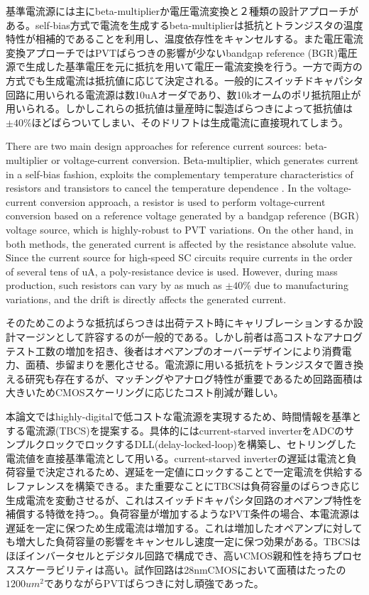 \documentclass[letterpaper, 10 pt, conference]{ieeeconf}  %
\begin{document}
基準電流源には主にbeta-multiplierか電圧電流変換と２種類の設計アプローチがある。self-bias方式で電流を生成するbeta-multiplierは抵抗とトランジスタの温度特性が相補的であることを利用し、温度依存性をキャンセルする\cite{azcona2014precision, osipov2016temperature}。また電圧電流変換アプローチではPVTばらつきの影響が少ないbandgap reference (BGR)電圧源で生成した基準電圧を元に抵抗を用いて電圧ー電流変換を行う\cite{banba1999cmos, ueno2009300}。一方で両方の方式でも生成電流は抵抗値に応じて決定される。一般的にスイッチドキャパシタ回路に用いられる電流源は数10uAオーダであり、数10kオームのポリ抵抗阻止が用いられる。しかしこれらの抵抗値は量産時に製造ばらつきによって抵抗値は$\pm40\%$ほどばらついてしまい、そのドリフトは生成電流に直接現れてしまう。

There are two main design approaches for reference current sources: beta-multiplier or voltage-current conversion. Beta-multiplier, which generates current in a self-bias fashion, exploits the complementary temperature characteristics of resistors and transistors to cancel the temperature dependence \cite{ azcona2014precision, osipov2016temperature}. In the voltage-current conversion approach, a resistor is used to perform voltage-current conversion based on a reference voltage generated by a bandgap reference (BGR) voltage source, which is highly-robust to PVT variations. On the other hand, in both methods, the generated current is affected by the resistance absolute value. Since the current source for high-speed SC circuits require currents in the order of several tens of uA, a poly-resistance device is used. However, during mass production, such resistors can vary by as much as $\pm40\%$ due to manufacturing variations, and the drift is directly affects the generated current.

そのためこのような抵抗ばらつきは出荷テスト時にキャリブレーションするか設計マージンとして許容するのが一般的である。しかし前者は高コストなアナログテスト工数の増加を招き、後者はオペアンプのオーバーデザインにより消費電力、面積、歩留まりを悪化させる。電流源に用いる抵抗をトランジスタで置き換える研究も存在するが\cite{hirose2010nano, osaki20131, choi201423pw}、マッチングやアナログ特性が重要であるため回路面積は大きいためCMOSスケーリングに応じたコスト削減が難しい。

本論文ではhighly-digitalで低コストな電流源を実現するため、時間情報を基準とする電流源(TBCS)を提案する\cite{yoshioka201728}。具体的にはcurrent-starved inverterをADCのサンプルクロックでロックするDLL(delay-locked-loop)を構築し、セトリングした電流値を直接基準電流として用いる。current-starved inverterの遅延は電流と負荷容量で決定されるため、遅延を一定値にロックすることで一定電流を供給するレファレンスを構築できる。また重要なことにTBCSは負荷容量のばらつき応じ生成電流を変動させるが、これはスイッチドキャパシタ回路のオペアンプ特性を補償する特徴を持つ。。負荷容量が増加するようなPVT条件の場合、本電流源は遅延を一定に保つため生成電流は増加する。これは増加したオペアンプに対しても増大した負荷容量の影響をキャンセルし速度一定に保つ効果がある。TBCSはほぼインバータセルとデジタル回路で構成でき、高いCMOS親和性を持ちプロセススケーラビリティは高い。試作回路は28nmCMOSにおいて面積はたったの$1200um^2$でありながらPVTばらつきに対し頑強であった。
\end{document}
